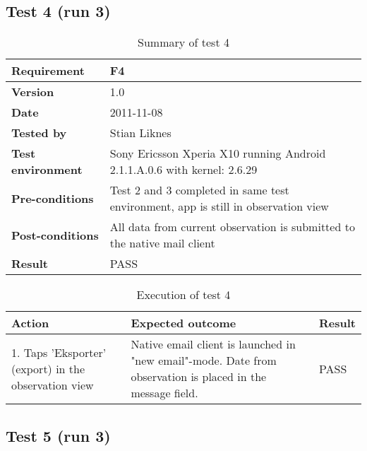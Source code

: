 \newpage
\subsection*{Test 4 (run 3)}

	\begin{table}[htb]
		\centering
		\begin{tabular}{|p{3.5cm}|p{7.0cm}|} \hline
			\textbf{Requirement} & F4 \\ \hline
			\textbf{Version} & 1.0 \\ \hline
			\textbf{Date} & 2011-11-08 \\ \hline
			\textbf{Tested by} & Stian Liknes \\ \hline
			\textbf{Test environment} & Sony Ericsson Xperia X10 running Android 2.1.1.A.0.6 with kernel: 2.6.29 \\ \hline
			\textbf{Pre-conditions} & Test 2 and 3 completed in same test environment, app is still in observation view \\ \hline
			\textbf{Post-conditions} & All data from current observation is submitted to the native mail client \\ \hline
			\textbf{Result} & PASS \\ \hline
		\end{tabular}
		\caption{Summary of test 4}
	\end{table}

	\begin{table}[htb]
		\centering
		\begin{tabular}{|p{5.0cm}|p{5.0cm}|p{1cm}|}
			\hline \textbf{Action} & \textbf{Expected outcome} & \textbf{Result} \\ \hline
			1. Taps 'Eksporter' (export) in the observation view &
			Native email client is launched in "new email"-mode. Date from
			observation is placed in the message field. &
			PASS \\ \hline
		\end{tabular}
		\caption{Execution of test 4}
	\end{table}

\newpage
\subsection*{Test 5 (run 3)}

